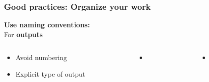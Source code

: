 \documentclass[xcolor=x11names,compress, aspectratio=169]{beamer}
\renewcommand{\(}{\begin{columns}}
\renewcommand{\)}{\end{columns}}
\newcommand{\<}[1]{\begin{column}{#1}}
\renewcommand{\>}{\end{column}}
\begin{document}
\begin{frame}
\frametitle{\textbf{Good practices:} Organize your work }
\textcolor{siap}{\textbf{Use naming conventions:} \\ }
For \textbf{outputs}
\begin{columns}[t]
 \begin{column}{0.3\textwidth}
    \begin{itemize}[<+->]
   \item Avoid numbering
   \item Explicit type of output
    \end{itemize}
\end{column}
  \begin{column}{0.2\textwidth}
    \begin{itemize}
    \item[]
    \end{itemize}
  \end{column}
  \begin{column}{0.5\textwidth}
    \begin{itemize}
    \item[]
    \end{itemize}
  \end{column}
\end{columns}
\end{frame}
\end{document}

